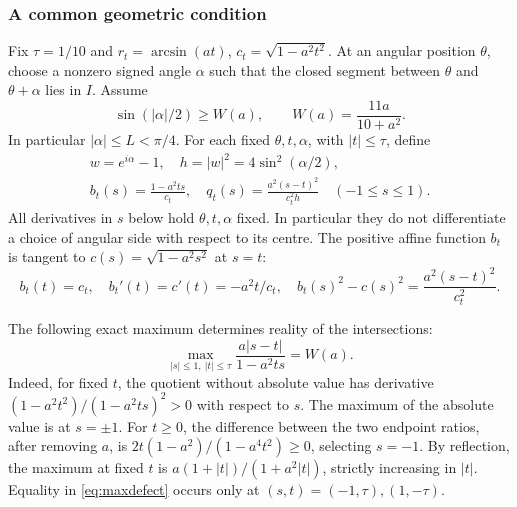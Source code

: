 \documentclass[11pt,a4paper]{article}
\begin{document}
\subsubsection{A common geometric condition}
Fix $\tau=1/10$ and $r_t=\arcsin(at)$, $c_t=\sqrt{1-a^2t^2}$.
At an angular position $\theta$, choose a nonzero signed angle $\alpha$
such that the closed segment between $\theta$ and $\theta+\alpha$
lies in $I$. Assume
\begin{equation}\label{eq:supportcondition}
 \sin(|\alpha|/2)\ge W(a),\qquad W(a)=\frac{11a}{10+a^2}.
\end{equation}
In particular $|\alpha|\le L<\pi/4$. For each fixed $\theta,t,\alpha$,
with $|t|\le\tau$, define
\begin{equation}\label{eq:bq}
 \begin{gathered}
 w=e^{i\alpha}-1,\quad h=|w|^2=4\sin^2(\alpha/2),\qquad
 \\
 b_t(s)=\frac{1-a^2ts}{c_t},\quad
 q_t(s)=\frac{a^2(s-t)^2}{c_t^2h}\quad(-1\le s\le1).
 \end{gathered}
\end{equation}
All derivatives in $s$ below hold $\theta,t,\alpha$ fixed. In particular
they do not differentiate a choice of angular side with respect to its
centre. The positive affine function $b_t$ is tangent to
$c(s)=\sqrt{1-a^2s^2}$ at $s=t$:
\begin{equation}\label{eq:tangent}
 b_t(t)=c_t,\quad b_t'(t)=c'(t)=-a^2t/c_t,\quad
 b_t(s)^2-c(s)^2=\frac{a^2(s-t)^2}{c_t^2}.
\end{equation}

The following exact maximum determines reality of the intersections:
\begin{equation}\label{eq:maxdefect}
 \max_{|s|\le1,\ |t|\le\tau}
 \frac{a|s-t|}{1-a^2ts}=W(a).
\end{equation}
Indeed, for fixed $t$, the quotient without absolute value has derivative
$(1-a^2t^2)/(1-a^2ts)^2>0$ with respect to $s$. The maximum of the
absolute value is at $s=\pm1$. For $t\ge0$, the difference between
the two endpoint ratios, after removing $a$, is
$2t(1-a^2)/(1-a^4t^2)\ge0$, selecting $s=-1$. By reflection, the
maximum at fixed $t$ is $a(1+|t|)/(1+a^2|t|)$, strictly increasing
in $|t|$. Equality in \eqref{eq:maxdefect} occurs only at
$(s,t)=(-1,\tau),(1,-\tau)$.
\end{document}
